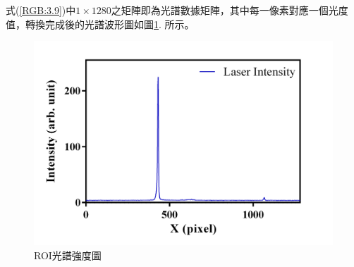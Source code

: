 式(\ref{RGB:3.9})中$1\times1280$之矩陣即為光譜數據矩陣，其中每一像素對應一個光度值，轉換完成後的光譜波形圖如圖\ref{ROI光譜強度圖}. 所示。
\begin{figure}[H] %
	\centering %
	\setlength{\abovecaptionskip}{0.cm}
	\includegraphics[width=\textwidth]{figures/Laser_Intensity.PNG} %
	\caption{ROI光譜強度圖} %
	\label{ROI光譜強度圖} %
\end{figure}
